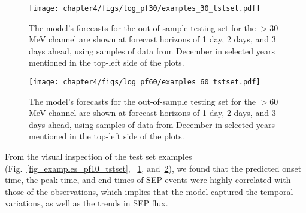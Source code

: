 \begin{figure}[htp]
    \centerline{\texttt{[image: chapter4/figs/log\_pf30/examples\_30\_tstset.pdf]}}
    \caption{The model's forecasts for the out-of-sample testing set for the $>$30 MeV channel are shown at forecast horizons of 1 day, 2 days, and 3 days ahead, using samples of data from December in selected years mentioned in the top-left side of the plots.}
\label{fig_examples_pf30_tstset}
\end{figure}

\begin{figure}[htp]
    \centerline{\texttt{[image: chapter4/figs/log\_pf60/examples\_60\_tstset.pdf]}}
    \caption{The model's forecasts for the out-of-sample testing set for the $>$60 MeV channel are shown at forecast horizons of 1 day, 2 days, and 3 days ahead, using samples of data from December in selected years mentioned in the top-left side of the plots.}
\label{fig_examples_pf60_tstset}
\end{figure}

From the visual inspection of the test set examples (Fig.~\ref{fig_examples_pf10_tstset}, ~\ref{fig_examples_pf30_tstset}, and~\ref{fig_examples_pf60_tstset}), we found that the predicted onset time, the peak time, and end times of SEP events were highly correlated with those of the observations, which implies that the model captured the temporal variations, as well as the trends in SEP flux.

